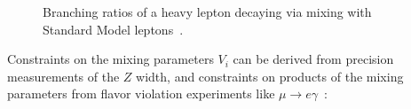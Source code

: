 \begin{figure}[h]
  \centering
  \caption{Branching ratios of a heavy lepton decaying via mixing with Standard Model leptons~\cite{Biggio:2011ja}.}
  \label{fig:resonance-branching-ratios}
\end{figure}

Constraints on the mixing parameters $V_i$ can be derived from precision measurements of the $Z$ width, and constraints on products of the mixing parameters from flavor violation experiments like $\mu\rightarrow e\gamma$~\cite{Abada:2008ea,Abada:2007ux,delAguila:2008pw,Altmannshofer:2013zba}:

